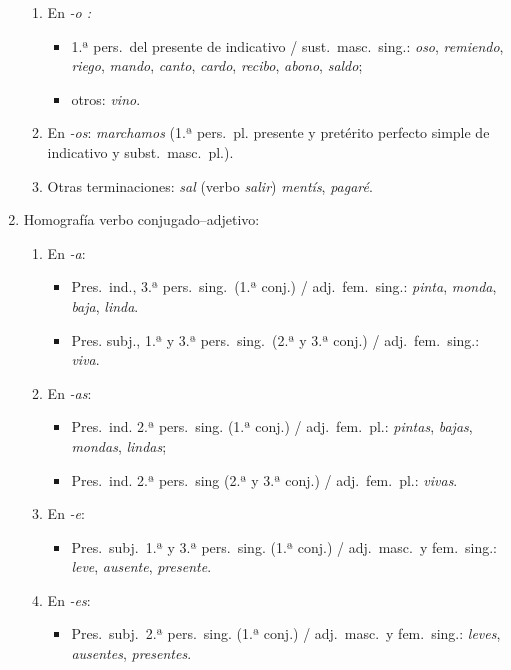 \begin{enumerate}
\begin{enumerate}
\item En \emph{-o :} \begin{itemize} \item 1.ª pers.\ del presente de indicativo / sust.\ masc.\ sing.: \emph{oso}, \emph{remiendo}, \emph{riego}, \emph{mando}, \emph{canto}, \emph{cardo}, \emph{recibo}, \emph{abono}, \emph{saldo}; \item otros: \emph{vino}. \end{itemize} 

\item En \emph{-os}: \emph{marchamos} (1.ª pers.\ pl. presente y pretérito perfecto simple de indicativo y subst.\ masc.\ pl.). 

\item Otras terminaciones: \emph{sal} (verbo \emph{salir}) \emph{mentís}, \emph{pagaré}. 

\end{enumerate} \item Homografía verbo conjugado--adjetivo: \begin{enumerate} 

\item En \emph{-a}: \begin{itemize} \item Pres.\ ind., 3.ª pers.\  sing.\ (1.ª conj.) / adj.\ fem.\ sing.: {\em pinta}, \emph{monda}, \emph{ baja}, \emph{linda}. \item Pres. subj., 1.ª y 3.ª pers.\ sing.\ (2.ª y 3.ª conj.) / adj.\ fem.\ sing.: \emph{viva}. \end{itemize} 

\item En \emph{-as}: \begin{itemize} \item Pres.\ ind. 2.ª pers.\ sing. (1.ª conj.) / adj.\ fem.\ pl.: \emph{pintas}, \emph{bajas}, \emph{mondas}, \emph{lindas}; \item Pres.\ ind. 2.ª pers.\ sing (2.ª y 3.ª conj.) / adj.\ fem.\ pl.: \emph{vivas}. \end{itemize} 

\item En \emph{-e}: \begin{itemize} \item Pres.\ subj.\ 1.ª y 3.ª pers.\ sing. (1.ª conj.) / adj.\ masc.\ y fem.\ sing.: \emph{leve}, \emph{ausente}, \emph{presente}. \end{itemize} 

\item En \emph{-es}: \begin{itemize} \item Pres.\ subj.\ 2.ª pers.\ sing. (1.ª conj.) / adj.\ masc.\ y fem.\ sing.: \emph{leves}, \emph{ausentes}, \emph{presentes}. \end{itemize} 


\end{enumerate}
\end{enumerate}
